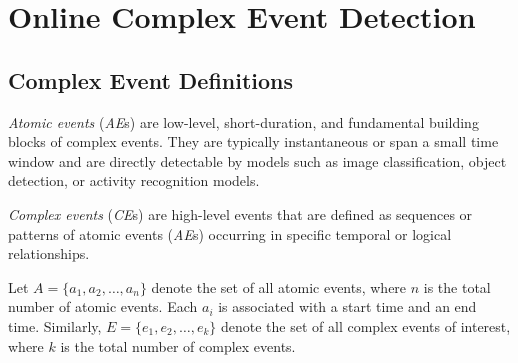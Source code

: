 \section{Online Complex Event Detection}
\subsection{Complex Event Definitions}


\begin{definition}
\label{def:AE}
\emph{Atomic events} (\emph{AE}s) are low-level, short-duration, and fundamental building blocks of complex events. They are typically instantaneous or span a small time window and are directly detectable by models such as image classification, object detection, or activity recognition models.
\end{definition}

\begin{definition}
\label{def:CE}
\emph{Complex events} (\emph{CE}s) are high-level events that are defined as sequences or patterns of atomic events (\emph{AE}s) occurring in specific temporal or logical relationships.
\end{definition}
Let $A = \{a_1, a_2, \ldots, a_n\}$ denote the set of all atomic events, where $n$ is the total number of atomic events. Each $a_i$ is associated with a start time and an end time. Similarly, $E = \{e_1, e_2, \ldots, e_k\}$ denote the set of all complex events of interest, where $k$ is the total number of complex events.

